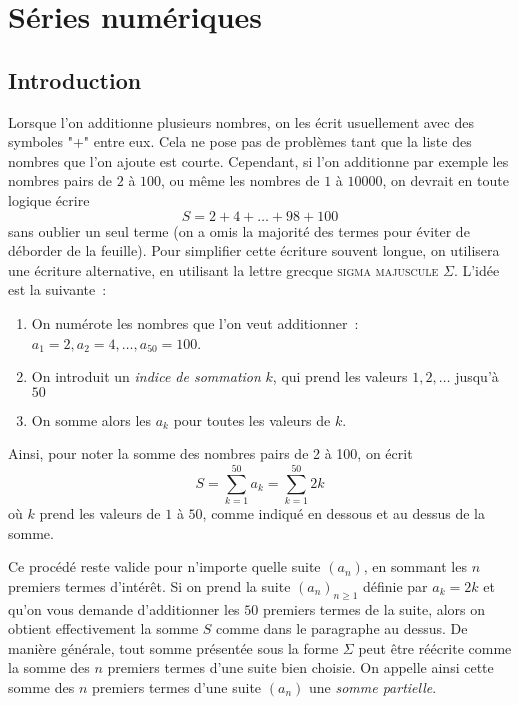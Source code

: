 \chapter{Séries numériques}
\section{Introduction}
Lorsque l'on additionne plusieurs nombres, on les écrit usuellement avec des symboles "+" entre eux. Cela ne pose pas de problèmes tant que la liste des nombres que l'on ajoute est courte. Cependant, si l'on additionne par exemple les nombres pairs de $2$ à $100$, ou même les nombres de $1$ à $10000$, on devrait en toute logique écrire
\[
S = 2 + 4 + \ldots + 98 + 100
\] sans oublier un seul terme (on a omis la majorité des termes pour éviter de déborder de la feuille). Pour simplifier cette écriture souvent longue, on utilisera une écriture alternative, en utilisant la lettre grecque \textsc{sigma majuscule} $\Sigma$. L'idée est la suivante~:
\begin{enumerate}
    \item On numérote les nombres que l'on veut additionner~: $a_1 = 2, a_2 = 4, \ldots, a_{50} = 100$.
    \item On introduit un \emph{indice de sommation} $k$, qui prend les valeurs $1, 2, \ldots$ jusqu'à $50$
    \item On somme alors les $a_k$ pour toutes les valeurs de $k$.
\end{enumerate}
Ainsi, pour noter la somme des nombres pairs de 2 à 100, on écrit
\[
S = \sum_{k = 1}^{50} a_k = \sum_{k = 1}^{50} 2k
\] où $k$ prend les valeurs de $1$ à $50$, comme indiqué en dessous et au dessus de la somme.

Ce procédé reste valide pour n'importe quelle suite $(a_n)$, en sommant les $n$ premiers termes d'intérêt. Si on prend la suite $(a_n)_{n \geq 1}$ définie par $a_k = 2k$ et qu'on vous demande d'additionner les $50$ premiers termes de la suite, alors on obtient effectivement la somme $S$ comme dans le paragraphe au dessus. De manière générale, tout somme présentée sous la forme $\Sigma$ peut être réécrite comme la somme des $n$ premiers termes d'une suite bien choisie. On appelle ainsi cette somme des $n$ premiers termes d'une suite $(a_n)$ une \emph{somme partielle}.

